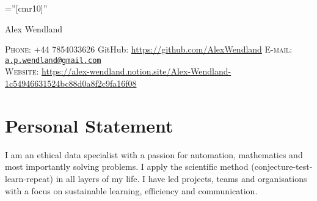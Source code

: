 \documentclass[a4paper,10pt]{article}
\begin{document}
\pagestyle{empty} %

\font\fb=''[cmr10]'' %

\par{\centering
		{\Huge Alex Wendland
	}\bigskip\par}
\vspace{-0.3 cm}
\begin{center}
	\textsc{Phone:} +44 7854033626 \hspace{1cm} GitHub: \href{https://github.com/AlexWendland}{https://github.com/AlexWendland} \hspace{1cm} \textsc{E-mail:} \href{mailto:a.p.wendland@gmail.com}{\texttt{a.p.wendland@gmail.com}}\\
	\textsc{Website:} \href{https://alex-wendland.notion.site/Alex-Wendland-1c54946631524bc88d0a8f2c9fa16f08}{https://alex-wendland.notion.site/Alex-Wendland-1c54946631524bc88d0a8f2c9fa16f08}
\end{center}

\section{Personal Statement}
I am an ethical data specialist with a passion for automation, mathematics and most importantly solving problems. I apply the scientific method (conjecture-test-learn-repeat) in all layers of my life. I have led projects, teams and organisations with a focus on sustainable learning, efficiency and communication.
\end{document}
